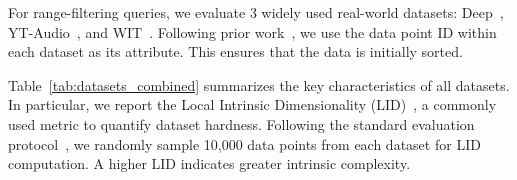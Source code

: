 \documentclass[sigconf, nonacm]{acmart}
\begin{document}
	
	For range-filtering queries, we evaluate 3 widely used real-world datasets: Deep~\cite{yandex_deep_dataset}, YT-Audio~\cite{youtube8m_dataset}, and WIT~\cite{wit_dataset}. Following prior work~\cite{DSG}, we use the data point ID within each dataset as its attribute. This ensures that the data is initially sorted.
	
	Table~\ref{tab:datasets_combined} summarizes the key characteristics of all datasets. In particular, we report the Local Intrinsic Dimensionality (LID)~\cite{Lid}, a commonly used metric to quantify dataset hardness. Following the standard evaluation protocol~\cite{LID2}, we randomly sample 10,000 data points from each dataset for LID computation. A higher LID indicates greater intrinsic complexity.
	
	\setlength{\textfloatsep}{0.1cm}
	\setlength{\floatsep}{0cm}
	\begin{table}[t]
		\centering
		
		\setlength{\abovecaptionskip}{0.05cm}
		\setlength{\textfloatsep}{0.cm}
		\caption{Datasets}
		
		\label{tab:datasets_combined}
	\end{table}
	
	
	
\end{document}
